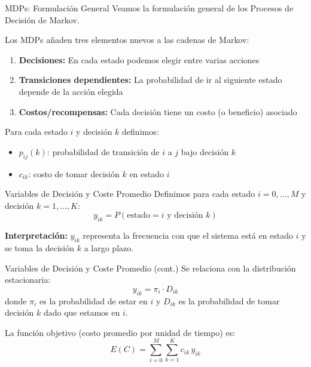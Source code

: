 \documentclass{beamer}
\begin{document}
\begin{frame}{MDPs: Formulación General}
    \small
    Veamos la formulación general de los Procesos de Decisión de Markov.

    \vspace{0.5em}

    Los MDPs añaden tres elementos nuevos a las cadenas de Markov:

    \vspace{0.5em}

    \begin{enumerate}
        \item \textbf{Decisiones:} En cada estado podemos elegir entre varias acciones

        \item \textbf{Transiciones dependientes:} La probabilidad de ir al siguiente estado depende de la acción elegida

        \item \textbf{Costos/recompensas:} Cada decisión tiene un costo (o beneficio) asociado
    \end{enumerate}

    \vspace{0.5em}

    Para cada estado $i$ y decisión $k$ definimos:
    \begin{itemize}
        \item $p_{ij}(k)$: probabilidad de transición de $i$ a $j$ bajo decisión $k$
        \item $c_{ik}$: costo de tomar decisión $k$ en estado $i$
    \end{itemize}
\end{frame}

\begin{frame}{Variables de Decisión y Coste Promedio}
    \small
    Definimos para cada estado $i=0,\dots,M$ y decisión $k=1,\dots,K$:
    \[
    y_{ik} = P(\text{estado}=i \text{ y decisión } k)
    \]

    \textbf{Interpretación:} $y_{ik}$ representa la frecuencia con que el sistema está en estado $i$ y se toma la decisión $k$ a largo plazo.
\end{frame}

\begin{frame}{Variables de Decisión y Coste Promedio (cont.)}
    \small
    Se relaciona con la distribución estacionaria:
    \[
    y_{ik} = \pi_i \cdot D_{ik}
    \]
    donde $\pi_i$ es la probabilidad de estar en $i$ y $D_{ik}$ es la probabilidad de tomar decisión $k$ dado que estamos en $i$.

    \vspace{1em}

    La función objetivo (costo promedio por unidad de tiempo) es:
    \[
    E(C) = \sum_{i=0}^M \sum_{k=1}^K c_{ik}\,y_{ik}
    \]
\end{frame}
\end{document}
